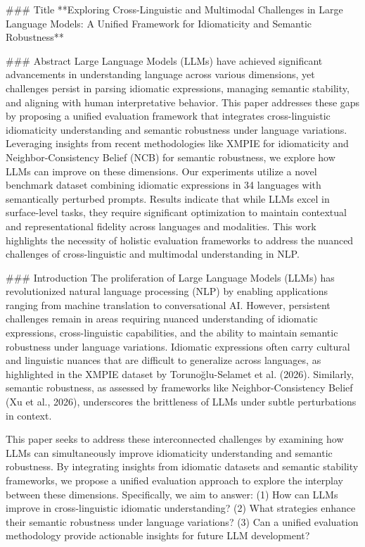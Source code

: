 ### Title
**Exploring Cross-Linguistic and Multimodal Challenges in Large Language Models: A Unified Framework for Idiomaticity and Semantic Robustness**

### Abstract
Large Language Models (LLMs) have achieved significant advancements in understanding language across various dimensions, yet challenges persist in parsing idiomatic expressions, managing semantic stability, and aligning with human interpretative behavior. This paper addresses these gaps by proposing a unified evaluation framework that integrates cross-linguistic idiomaticity understanding and semantic robustness under language variations. Leveraging insights from recent methodologies like XMPIE for idiomaticity and Neighbor-Consistency Belief (NCB) for semantic robustness, we explore how LLMs can improve on these dimensions. Our experiments utilize a novel benchmark dataset combining idiomatic expressions in 34 languages with semantically perturbed prompts. Results indicate that while LLMs excel in surface-level tasks, they require significant optimization to maintain contextual and representational fidelity across languages and modalities. This work highlights the necessity of holistic evaluation frameworks to address the nuanced challenges of cross-linguistic and multimodal understanding in NLP.

### Introduction
The proliferation of Large Language Models (LLMs) has revolutionized natural language processing (NLP) by enabling applications ranging from machine translation to conversational AI. However, persistent challenges remain in areas requiring nuanced understanding of idiomatic expressions, cross-linguistic capabilities, and the ability to maintain semantic robustness under language variations. Idiomatic expressions often carry cultural and linguistic nuances that are difficult to generalize across languages, as highlighted in the XMPIE dataset by Torunoğlu-Selamet et al. (2026). Similarly, semantic robustness, as assessed by frameworks like Neighbor-Consistency Belief (Xu et al., 2026), underscores the brittleness of LLMs under subtle perturbations in context.

This paper seeks to address these interconnected challenges by examining how LLMs can simultaneously improve idiomaticity understanding and semantic robustness. By integrating insights from idiomatic datasets and semantic stability frameworks, we propose a unified evaluation approach to explore the interplay between these dimensions. Specifically, we aim to answer: (1) How can LLMs improve in cross-linguistic idiomatic understanding? (2) What strategies enhance their semantic robustness under language variations? (3) Can a unified evaluation methodology provide actionable insights for future LLM development?

